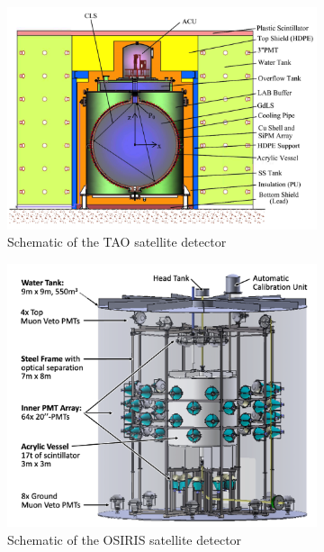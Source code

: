 \documentclass[../main.tex]{subfiles}
\begin{document}
\begin{figure}[ht]
  \centering
  \begin{subfigure}[t]{0.49\linewidth}
    \includegraphics[width=\linewidth]{images/juno/tao_schematic.png}
    \caption{Schematic of the TAO satellite detector}
    \label{fig:juno:tao}
  \end{subfigure}
  \hfill
  \begin{subfigure}[t]{0.49\linewidth}
    \includegraphics[width=\linewidth]{images/juno/osiris_schematic.png}
    \caption{Schematic of the OSIRIS satellite detector}
    \label{fig:juno:osiris}
  \end{subfigure}
  \caption{}
\end{figure}
\end{document}
